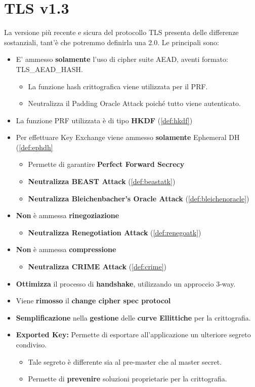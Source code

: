 \section{TLS v1.3}
La versione più recente e sicura del protocollo TLS presenta delle differenze sostanziali, tant'è che potremmo definirla una 2.0. Le principali sono:
\begin{theorem}\label{thm:tls13}
\begin{itemize}
    \item E' ammesso \textbf{solamente} l'uso di cipher suite AEAD, aventi formato: TLS\_AEAD\_HASH.
    \begin{itemize}
        \item La funzione hash crittografica viene utilizzata per il PRF.
        \item Neutralizza il Padding Oracle Attack poiché tutto viene autenticato.
    \end{itemize}
    \item La funzione PRF utilizzata è di tipo \textbf{HKDF} (\cref{def:hkdf})
    \item Per effettuare Key Exchange viene ammesso \textbf{solamente} Ephemeral DH (\cref{def:ephdh}
    \begin{itemize}
        \item Permette di garantire \textbf{Perfect Forward Secrecy}
        \item \textbf{Neutralizza BEAST Attack} (\cref{def:beastatk})
        \item \textbf{Neutralizza Bleichenbacher's Oracle Attack} (\cref{def:bleichenoracle})
    \end{itemize}
    \item \textbf{Non} è ammessa \textbf{rinegoziazione}
    \begin{itemize}
        \item \textbf{Neutralizza Renegotiation Attack} (\cref{def:renegoatk})
    \end{itemize}
    \item \textbf{Non} è ammessa \textbf{compressione}
    \begin{itemize}
        \item \textbf{Neutralizza CRIME Attack} (\cref{def:crime})
    \end{itemize}
    \item \textbf{Ottimizza} il processo di \textbf{handshake}, utilizzando un approccio 3-way.
    \item Viene \textbf{rimosso} il \textbf{change cipher spec protocol}
    \item \textbf{Semplificazione} nella \textbf{gestione} delle \textbf{curve Ellittiche} per la crittografia.
    \item \textbf{Exported Key:} Permette di esportare all'applicazione un ulteriore segreto condiviso.
    \begin{itemize}
        \item Tale segreto è differente sia al pre-master che al master secret.
        \item Permette di \textbf{prevenire} soluzioni proprietarie per la crittografia.
    \end{itemize}
\end{itemize}
\end{theorem}
